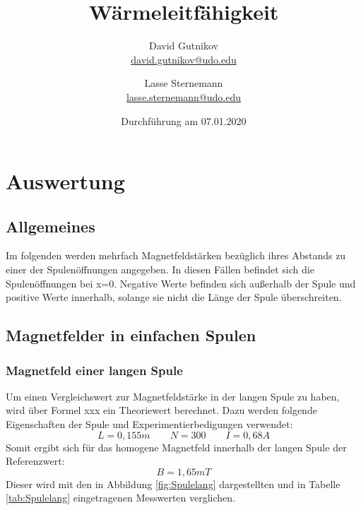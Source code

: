 \documentclass[titlepage = firstcover]{scrartcl}
\title{Wärmeleitfähigkeit}
\author{
  David Gutnikov\\
  \href{mailto:david.gutnikov@udo.edu}{david.gutnikov@udo.edu}
 \and 
  Lasse Sternemann\\
  \href{mailto:lasse.sternemann@udo.edu}{lasse.sternemann@udo.edu}
}
\date{Durchführung am 07.01.2020}
\begin{document}
  \maketitle
  \newpage
  \tableofcontents
  \newpage


\section{Auswertung}
    \subsection{Allgemeines}
        Im folgenden werden mehrfach Magnetfeldstärken bezüglich ihres Abstands zu einer der Spulenöffnungen angegeben. In diesen Fällen befindet sich die 
        Spulenöffnungen bei x=0. Negative Werte befinden sich außerhalb der Spule und positive Werte innerhalb, solange sie nicht die Länge der Spule 
        überschreiten.
    \subsection{Magnetfelder in einfachen Spulen}
        \subsubsection{Magnetfeld einer langen Spule}
            Um einen Vergleichswert zur Magnetfeldstärke in der langen Spule zu haben, wird über Formel xxx ein Theoriewert berechnet. Dazu werden folgende 
            Eigenschaften der Spule und Experimentierbedigungen verwendet:
            \begin{equation*}  
                L = 0,155m \qquad N = 300 \qquad I = 0,68 A 
            \end{equation*}    
            Somit ergibt sich für das homogene Magnetfeld innerhalb der langen Spule der Referenzwert:
            \begin{equation}
                B = 1,65 mT 
                \label{eqn:BLang}
            \end{equation}
            Dieser wird mit den in Abbildung \ref{fig:Spulelang} dargestellten und in Tabelle \ref{tab:Spulelang} eingetragenen Messwerten verglichen.
\end{document}
